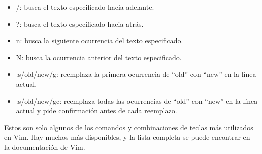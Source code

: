 \documentclass[
  letterpaper,
  DIV=11,
  numbers=noendperiod]{scrartcl}
\providecommand{\tightlist}{%
  \setlength{\itemsep}{0pt}\setlength{\parskip}{0pt}}\usepackage{longtable,booktabs,array}
\begin{document}
\begin{enumerate}
  \begin{itemize}
  \tightlist
  \item
    /: busca el texto especificado hacia adelante.
  \item
    ?: busca el texto especificado hacia atrás.
  \item
    n: busca la siguiente ocurrencia del texto especificado.
  \item
    N: busca la ocurrencia anterior del texto especificado.
  \item
    :s/old/new/g: reemplaza la primera ocurrencia de ``old'' con ``new''
    en la línea actual.
  \item
    :s/old/new/gc: reemplaza todas las ocurrencias de ``old'' con
    ``new'' en la línea actual y pide confirmación antes de cada
    reemplazo.
  \end{itemize}
\end{enumerate}

Estos son solo algunos de los comandos y combinaciones de teclas más
utilizados en Vim. Hay muchos más disponibles, y la lista completa se
puede encontrar en la documentación de Vim.


\printbibliography
\end{document}
